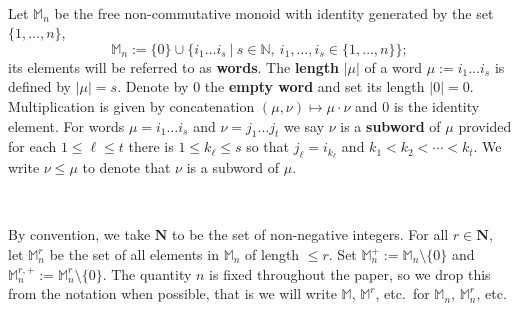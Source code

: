\documentclass[10pt]{amsart}
\theoremstyle{Theorem}
\theoremstyle{definition}
\begin{document}
\

Let ${\mathbb M}_n$ be the free non-commutative monoid with identity generated by the set $\{1,\ldots,n\}$, $$\mathbb M_n:=\{0\}\cup \{i_1\ldots i_s\ |\ s\in \mathbb N,\ i_1,\ldots,i_s\in \{1,\ldots,n\}\};$$ its elements will be referred to as {\bf words}. The {\bf length} $|\mu|$ of a word $\mu:=i_1\ldots i_s$ is defined by $|\mu|=s$. Denote by $0$ the {\bf empty word} and set its length $|0|=0$. Multiplication is given by concatenation $(\mu,\nu)\mapsto \mu\cdot \nu$ and $0$ is the identity element. For words $\mu = i_1\ldots i_s$ and $\nu = j_1 \ldots j_t$ we say $\nu$ is a {\bf subword} of $\mu$ provided for each $1 \leq \ell \leq t$ there is $1 \leq k_\ell \leq s$ so that $j_\ell = i_{k_\ell}$ and $k_1< k_2< \cdots < k_t$. We write $\nu \leq \mu$ to denote that $\nu$ is a subword of $\mu$. 

\

By convention, we take $\mathbf{N}$ to be the set of non-negative integers. For all $r\in \mathbf{N}$, let ${\mathbb M}^r_n$ be the set of all elements in ${\mathbb M}_n$ of length $\leq r$. Set $\mathbb M_n^+:=\mathbb M_n\setminus \{0\}$ and $\mathbb M_n^{r,+}:=\mathbb M_n^r\setminus \{0\}$. The quantity $n$ is fixed throughout the paper, so we drop this from the notation when possible, that is we will write $\mathbb M$, $\mathbb M^r$, etc.\ for $\mathbb M_n$, $\mathbb M_n^r$, etc.  

\
\end{document}
